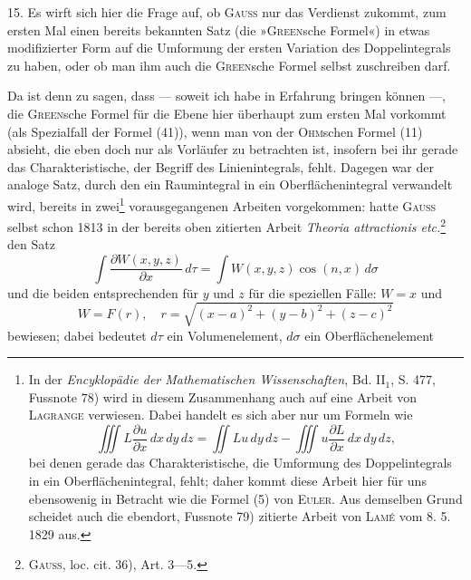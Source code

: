 \clearpage\begingroup\NoSourceHead{}
\makeatletter\tagsleft@true\let\veqno\@@leqno\makeatother
\renewcommand{\thefootnote}{\arabic{footnote})}\setcounter{footnote}{40}
\noindent\hspace*{\parindent}15. Es wirft sich hier die Frage auf, ob \textsc{Gauss} nur das Verdienst zukommt,
zum ersten Mal einen bereits bekannten Satz (die »\textsc{Green}sche Formel«)
in etwas modifizierter Form auf die Umformung der ersten Variation
des Doppelintegrals  zu haben, oder ob man ihm auch die \textsc{Green}sche
Formel selbst zuschreiben darf.

Da ist denn zu sagen, dass — soweit ich habe in Erfahrung bringen
können —, die \textsc{Green}sche Formel für die Ebene hier überhaupt zum ersten
Mal vorkommt (als Spezialfall der Formel (41)), wenn man von der \textsc{Ohm}schen
Formel (11) absieht, die eben doch nur als Vorläufer zu betrachten ist, insofern
bei ihr gerade das Charakteristische, der Begriff des Linienintegrals, fehlt.
Dagegen war der analoge Satz, durch den ein Raumintegral in ein Oberflächenintegral
verwandelt wird, bereits in zwei\footnote{In der \textit{Encyklopädie der Mathematischen Wissenschaften}, Bd. II$_1$, S. 477, Fussnote 78) wird in
diesem Zusammenhang auch auf eine Arbeit von \textsc{Lagrange} verwiesen. Dabei handelt es sich aber nur
um Formeln wie
\[
\iiint L\frac{\partial u}{\partial x}\,dx\,dy\,dz
=\iint Lu\,dy\,dz-\iiint u\frac{\partial L}{\partial x}\,dx\,dy\,dz,
\]
bei denen gerade das Charakteristische, die Umformung des Doppelintegrals in ein Oberflächenintegral, fehlt;
daher kommt diese Arbeit hier für uns ebensowenig in Betracht wie die Formel (5) von \textsc{Euler}. Aus demselben
Grund scheidet auch die ebendort, Fussnote 79) zitierte Arbeit von \textsc{Lamé} vom 8. 5. 1829 aus.} vorausgegangenen Arbeiten vorgekommen:
\clearpage{}
\noindent{} hatte \textsc{Gauss} selbst schon 1813 in der bereits oben zitierten
Arbeit \textit{Theoria attractionis etc.}\footnote{\textsc{Gauss}, loc. cit. 36), Art. 3—5.} den Satz
\begin{equation*}
\int\frac{\partial W(x,y,z)}{\partial x}\,d\tau
=\int W(x,y,z)\cos(n,x)\,d\sigma\tag{42}
\end{equation*}
und die beiden entsprechenden für $y$ und $z$ für die speziellen Fälle: $W=x$ und
\[
W=F(r),\quad r=\sqrt{(x-a)^2+(y-b)^2+(z-c)^2}
\]
bewiesen; dabei bedeutet $d\tau$ ein Volumenelement, $d\sigma$ ein Oberflächenelement
